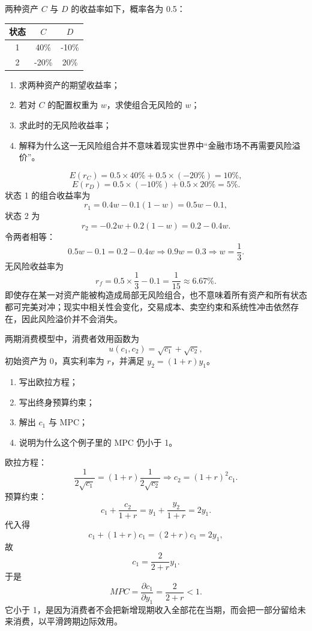 \begin{question}
两种资产 $C$ 与 $D$ 的收益率如下，概率各为 0.5：
\begin{center}
\begin{tabular}{c|cc}
状态 & $C$ & $D$\\\hline
1 & 40\% & -10\%\\
2 & -20\% & 20\%
\end{tabular}
\end{center}
\begin{enumerate}[label=(\alph*),leftmargin=2.5em]
  \item 求两种资产的期望收益率；
  \item 若对 $C$ 的配置权重为 $w$，求使组合无风险的 $w$；
  \item 求此时的无风险收益率；
  \item 解释为什么这一无风险组合并不意味着现实世界中“金融市场不再需要风险溢价”。
\end{enumerate}
\begin{solution}
\[
E(r_C)=0.5\times40\%+0.5\times(-20\%)=10\%,
\]
\[
E(r_D)=0.5\times(-10\%)+0.5\times20\%=5\%.
\]
状态 1 的组合收益率为
\[
r_1=0.4w-0.1(1-w)=0.5w-0.1,
\]
状态 2 为
\[
r_2=-0.2w+0.2(1-w)=0.2-0.4w.
\]
令两者相等：
\[
0.5w-0.1=0.2-0.4w\Rightarrow 0.9w=0.3\Rightarrow w=\frac13.
\]
无风险收益率为
\[
r_f=0.5\times\frac13-0.1=\frac{1}{15}\approx 6.67\%.
\]
即使存在某一对资产能被构造成局部无风险组合，也不意味着所有资产和所有状态都可完美对冲；现实中相关性会变化，交易成本、卖空约束和系统性冲击依然存在，因此风险溢价并不会消失。
\end{solution}
\end{question}

\begin{question}
两期消费模型中，消费者效用函数为
\[
u(c_1,c_2)=\sqrt{c_1}+\sqrt{c_2},
\]
初始资产为 0，真实利率为 $r$，并满足 $y_2=(1+r)y_1$。
\begin{enumerate}[label=(\alph*),leftmargin=2.5em]
  \item 写出欧拉方程；
  \item 写出终身预算约束；
  \item 解出 $c_1$ 与 MPC；
  \item 说明为什么这个例子里的 MPC 仍小于 1。
\end{enumerate}
\begin{solution}
欧拉方程：
\[
\frac{1}{2\sqrt{c_1}}=(1+r)\frac{1}{2\sqrt{c_2}}
\Rightarrow c_2=(1+r)^2c_1.
\]
预算约束：
\[
c_1+\frac{c_2}{1+r}=y_1+\frac{y_2}{1+r}=2y_1.
\]
代入得
\[
c_1+(1+r)c_1=(2+r)c_1=2y_1,
\]
故
\[
c_1=\frac{2}{2+r}y_1.
\]
于是
\[
MPC=\frac{\partial c_1}{\partial y_1}=\frac{2}{2+r}<1.
\]
它小于 1，是因为消费者不会把新增现期收入全部花在当期，而会把一部分留给未来消费，以平滑跨期边际效用。
\end{solution}
\end{question}

